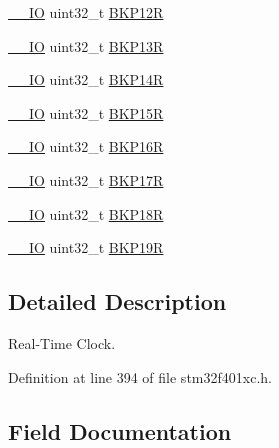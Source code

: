 \begin{DoxyCompactItemize}
\item 
\hyperlink{core__sc300_8h_aec43007d9998a0a0e01faede4133d6be}{\+\_\+\+\_\+\+IO} uint32\+\_\+t \hyperlink{struct_r_t_c___type_def_a6f7eee5ae8a32c07f9c8fe14281bdaf3}{B\+K\+P12R}
\item 
\hyperlink{core__sc300_8h_aec43007d9998a0a0e01faede4133d6be}{\+\_\+\+\_\+\+IO} uint32\+\_\+t \hyperlink{struct_r_t_c___type_def_a6ed4c3a0d4588a75078e9f8e376b4d06}{B\+K\+P13R}
\item 
\hyperlink{core__sc300_8h_aec43007d9998a0a0e01faede4133d6be}{\+\_\+\+\_\+\+IO} uint32\+\_\+t \hyperlink{struct_r_t_c___type_def_ac60f13e6619724747e61cfbff55b9fab}{B\+K\+P14R}
\item 
\hyperlink{core__sc300_8h_aec43007d9998a0a0e01faede4133d6be}{\+\_\+\+\_\+\+IO} uint32\+\_\+t \hyperlink{struct_r_t_c___type_def_afafaddc3a983eb71332b7526d82191ad}{B\+K\+P15R}
\item 
\hyperlink{core__sc300_8h_aec43007d9998a0a0e01faede4133d6be}{\+\_\+\+\_\+\+IO} uint32\+\_\+t \hyperlink{struct_r_t_c___type_def_ad2f2eb2fb4b93e21515b10e920e719b6}{B\+K\+P16R}
\item 
\hyperlink{core__sc300_8h_aec43007d9998a0a0e01faede4133d6be}{\+\_\+\+\_\+\+IO} uint32\+\_\+t \hyperlink{struct_r_t_c___type_def_a2842aa523df62f3508316eb3b2e08f4e}{B\+K\+P17R}
\item 
\hyperlink{core__sc300_8h_aec43007d9998a0a0e01faede4133d6be}{\+\_\+\+\_\+\+IO} uint32\+\_\+t \hyperlink{struct_r_t_c___type_def_a640ccb2ccfb6316b88c070362dc29339}{B\+K\+P18R}
\item 
\hyperlink{core__sc300_8h_aec43007d9998a0a0e01faede4133d6be}{\+\_\+\+\_\+\+IO} uint32\+\_\+t \hyperlink{struct_r_t_c___type_def_a4ec1dd54d976989b7c9e59fb14d974fb}{B\+K\+P19R}
\end{DoxyCompactItemize}


\subsection{Detailed Description}
Real-\/\+Time Clock. 

Definition at line 394 of file stm32f401xc.\+h.



\subsection{Field Documentation}
